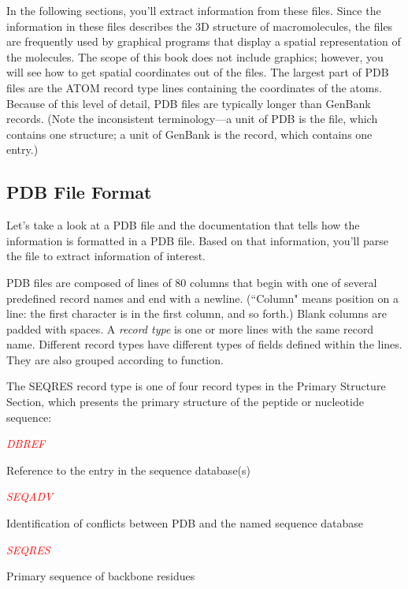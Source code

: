 In the following sections, you'll extract information from these files. Since the information in these files describes the 3D structure of macromolecules, the files are frequently used by graphical programs that display a spatial representation of the molecules. The scope of this book does not include graphics; however, you will see how to get spatial coordinates out of the files. The largest part of PDB files are the ATOM record type lines containing the coordinates of the atoms. Because of this level of detail, PDB files are typically longer than GenBank records. (Note the inconsistent terminology—a unit of PDB is the file, which contains one structure; a unit of GenBank is the record, which contains one entry.) 

\subsection{PDB File Format}
Let's take a look at a PDB file and the documentation that tells how the information is formatted in a PDB file. Based on that information, you'll parse the file to extract information of interest.

PDB files are composed of lines of 80 columns that begin with one of several predefined record names and end with a newline. (``Column" means position on a line: the first character is in the first column, and so forth.) Blank columns are padded with spaces. A \textit{record type} is one or more lines with the same record name. Different record types have different types of fields defined within the lines. They are also grouped according to function.

The SEQRES record type is one of four record types in the Primary Structure Section, which presents the primary structure of the peptide or nucleotide sequence: 

\textcolor{red}{\textit{DBREF}}
\begin{adjustwidth}{1cm}{}
Reference to the entry in the sequence database(s)
\end{adjustwidth}

\textcolor{red}{\textit{SEQADV}}
\begin{adjustwidth}{1cm}{}
Identification of conflicts between PDB and the named sequence database 
\end{adjustwidth}

\textcolor{red}{\textit{SEQRES}}
\begin{adjustwidth}{1cm}{}
Primary sequence of backbone residues 
\end{adjustwidth}

